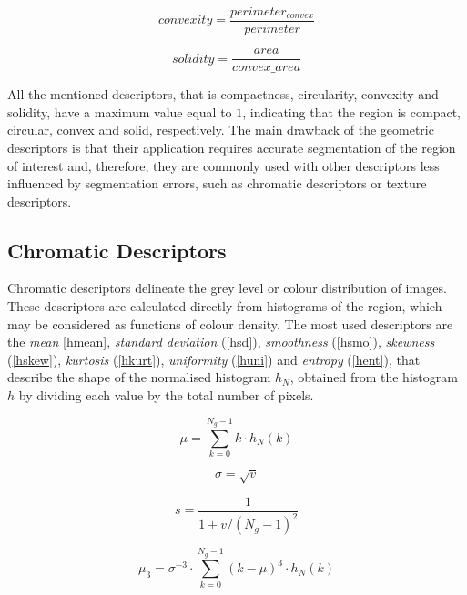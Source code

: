 \documentclass[final,a4paper,12pt,english]{UnicaPhdThesis3}
\begin{document}
\begin{equation}\label{convexity}
convexity=\frac{perimeter_{convex}}{perimeter}
\end{equation}

\begin{equation}\label{solidity}
solidity=\frac{area}{convex\_area}
\end{equation}

All the mentioned descriptors, that is compactness, circularity, convexity and solidity, have a maximum value equal to $1$, indicating that the region is compact, circular, convex and solid, respectively.  The main drawback of the geometric descriptors is that their application requires accurate segmentation of the region of interest and, therefore, they are commonly used with other descriptors less influenced by segmentation errors, such as chromatic descriptors or texture descriptors.

\subsection{Chromatic Descriptors} %
Chromatic descriptors delineate the grey level or colour distribution of images. These descriptors are calculated directly from histograms of the region, which may be considered as functions of colour density. The most used descriptors are the \textit{mean} \ref{hmean},  \textit{standard deviation} (\ref{hsd}), \textit{smoothness} (\ref{hsmo}), \textit{skewness} (\ref{hskew}), \textit{kurtosis} (\ref{hkurt}), \textit{uniformity} (\ref{huni}) and \textit{entropy} (\ref{hent}), that describe the shape of the normalised histogram $h_N$, obtained from the histogram $h$ by dividing each value by the total number of pixels.

\begin{equation}\label{hmean}
\mu=\sum_{k=0}^{N_{g}-1} k\cdot h_N(k)
\end{equation}

\begin{equation}\label{hsd}
\sigma=\sqrt{v}
\end{equation}

\begin{equation}\label{hsmo}
s=\frac{1}{1 + v/(N_{g}-1)^2 }
\end{equation}

\begin{equation}\label{hskew}
\mu_3=\sigma^{-3} \cdot \sum_{k=0}^{N_{g}-1} (k - \mu)^3 \cdot h_N(k)
\end{equation}
\end{document}
